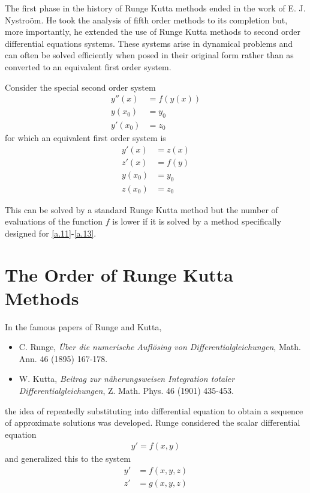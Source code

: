 \documentclass[a4paper,oneside]{book}
\numberwithin{equation}{chapter}
\begin{document}
The first phase in the history of Runge Kutta methods ended in the work of E. J. Nystro\"{o}m. He took the analysis of fifth order methods to its completion but, more importantly, he extended the use of Runge Kutta methods to second order differential equations systems. These systems arise in dynamical problems and can often be solved efficiently when posed in their original form rather than as converted to an equivalent first order system. 

Consider the special second order system
\begin{align}
\label{a.11}
y''\left( x \right) &= f\left( {y\left( x \right)} \right)\\
y\left( {{x_0}} \right) &= {y_0}\\
y'\left( {{x_0}} \right) &= {z_0} \label{a.13}
\end{align}
for which an equivalent first order system is
\begin{align}
y'\left( x \right) &= z\left( x \right)\\
z'\left( x \right) &= f\left( y \right)\\
y\left( {{x_0}} \right) &= {y_0}\\
z\left( {{x_0}} \right) &= {z_0}
\end{align}

This can be solved by a standard Runge Kutta method but the number of evaluations of the function $f$ is lower if it is solved by a method specifically designed for \eqref{a.11}-\eqref{a.13}.
\section{The Order of Runge Kutta Methods}
In the famous papers of Runge and Kutta,
\begin{itemize}
\item C. Runge, \textit{\"{U}ber die numerische Aufl\"{o}sing von Differentialgleichungen}, Math. Ann. 46 (1895) 167-178.
\item W. Kutta, \textit{Beitrag zur n\"{a}herungsweisen Integration totaler Differentialgleichungen}, Z. Math. Phys. 46 (1901) 435-453.
\end{itemize}
the idea of repeatedly substituting into differential equation to obtain a sequence of approximate solutions was developed. Runge considered the scalar differential equation
\begin{align}
y' = f\left( {x,y} \right)
\end{align}
and generalized this to the system
\begin{align}
y' &= f\left( {x,y,z} \right)\\
z' &= g\left( {x,y,z} \right)
\end{align}
\end{document}
